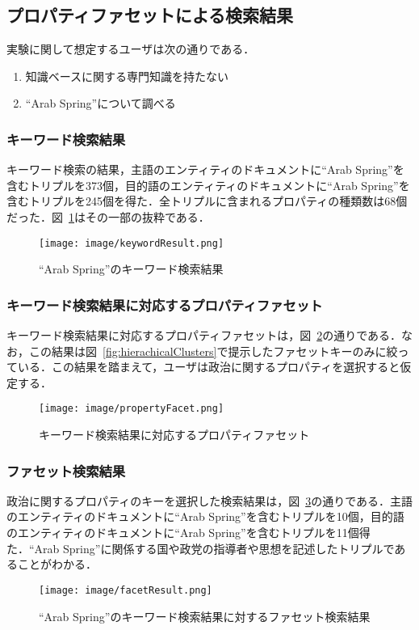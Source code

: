 \subsection{プロパティファセットによる検索結果}
実験に関して想定するユーザは次の通りである．
\begin{enumerate}
	\item 知識ベースに関する専門知識を持たない
	\item ``Arab Spring''について調べる
\end{enumerate}

\subsubsection{キーワード検索結果}
キーワード検索の結果，主語のエンティティのドキュメントに``Arab Spring''を含むトリプルを373個，目的語のエンティティのドキュメントに``Arab Spring''を含むトリプルを245個を得た．全トリプルに含まれるプロパティの種類数は68個だった．図~\ref{fig:keywordResult}はその一部の抜粋である．
%
\begin{figure}[h]
\centering
\texttt{[image: image/keywordResult.png]}
\caption{\small
``Arab Spring''のキーワード検索結果
}
\label{fig:keywordResult}
\end{figure}
%
\subsubsection{キーワード検索結果に対応するプロパティファセット}
キーワード検索結果に対応するプロパティファセットは，図~\ref{fig:propertyFacet}の通りである．なお，この結果は図~\ref{fig:hierachicalClusters}で提示したファセットキーのみに絞っている．この結果を踏まえて，ユーザは政治に関するプロパティを選択すると仮定する．
%
\begin{figure}[h]
\centering
\texttt{[image: image/propertyFacet.png]}
\caption{\small
キーワード検索結果に対応するプロパティファセット
}
\label{fig:propertyFacet}
\end{figure}
%
\subsubsection{ファセット検索結果}
政治に関するプロパティのキーを選択した検索結果は，図~\ref{fig:facetResult}の通りである．主語のエンティティのドキュメントに``Arab Spring''を含むトリプルを10個，目的語のエンティティのドキュメントに``Arab Spring''を含むトリプルを11個得た．``Arab Spring''に関係する国や政党の指導者や思想を記述したトリプルであることがわかる．
%
\begin{figure}[h]
\centering
\texttt{[image: image/facetResult.png]}
\caption{\small
``Arab Spring''のキーワード検索結果に対するファセット検索結果
}
\label{fig:facetResult}
\end{figure}
%


